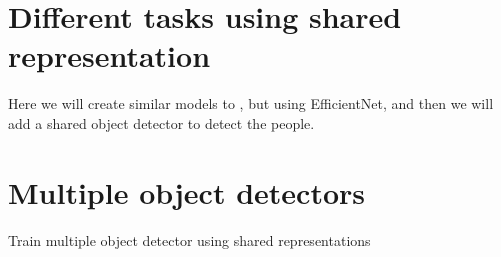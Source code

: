 \section{Different tasks using shared representation}
Here we will create similar models to \citep{visualPerson}, but using EfficientNet, and then we will add a shared object detector to detect the people.

\section{Multiple object detectors}
Train multiple object detector using shared representations